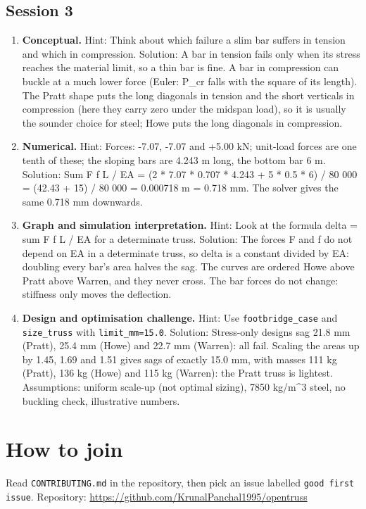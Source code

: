 \documentclass[11pt,a4paper]{article}
\begin{document}
\subsection*{Session 3}
\begin{enumerate}[nosep]
\item \textbf{Conceptual.} Hint: Think about which failure a slim bar suffers in tension and which in compression. Solution: A bar in tension fails only when its stress reaches the material limit, so a thin bar is fine. A bar in compression can buckle at a much lower force (Euler: P\_cr falls with the square of its length). The Pratt shape puts the long diagonals in tension and the short verticals in compression (here they carry zero under the midspan load), so it is usually the sounder choice for steel; Howe puts the long diagonals in compression.
\item \textbf{Numerical.} Hint: Forces: -7.07, -7.07 and +5.00 kN; unit-load forces are one tenth of these; the sloping bars are 4.243 m long, the bottom bar 6 m. Solution: Sum F f L / EA = (2 * 7.07 * 0.707 * 4.243 + 5 * 0.5 * 6) / 80 000 = (42.43 + 15) / 80 000 = 0.000718 m = 0.718 mm. The solver gives the same 0.718 mm downwards.
\item \textbf{Graph and simulation interpretation.} Hint: Look at the formula delta = sum F f L / EA for a determinate truss. Solution: The forces F and f do not depend on EA in a determinate truss, so delta is a constant divided by EA: doubling every bar's area halves the sag. The curves are ordered Howe above Pratt above Warren, and they never cross. The bar forces do not change: stiffness only moves the deflection.
\item \textbf{Design and optimisation challenge.} Hint: Use \texttt{footbridge\_case} and \texttt{size\_truss} with \texttt{limit\_mm=15.0}. Solution: Stress-only designs sag 21.8 mm (Pratt), 25.4 mm (Howe) and 22.7 mm (Warren): all fail. Scaling the areas up by 1.45, 1.69 and 1.51 gives sags of exactly 15.0 mm, with masses 111 kg (Pratt), 136 kg (Howe) and 115 kg (Warren): the Pratt truss is lightest. Assumptions: uniform scale-up (not optimal sizing), 7850 kg/m\textasciicircum{}3 steel, no buckling check, illustrative numbers.
\end{enumerate}

\section{How to join}
Read \texttt{CONTRIBUTING.md} in the repository, then pick an issue labelled \texttt{good first issue}. Repository: \url{https://github.com/KrunalPanchal1995/opentruss}
\end{document}
